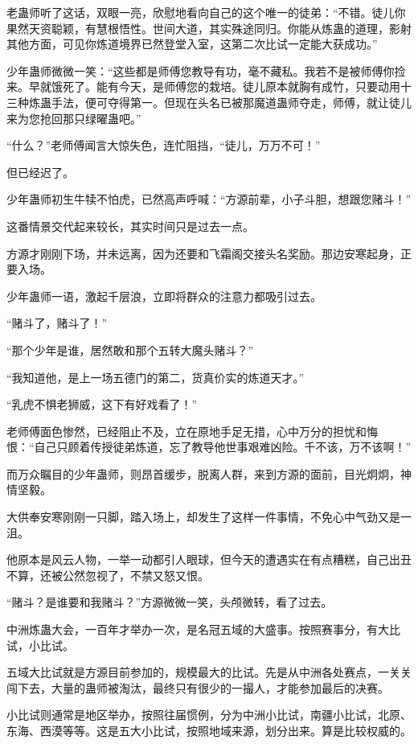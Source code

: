 \begin{this_body}
老蛊师听了这话，双眼一亮，欣慰地看向自己的这个唯一的徒弟：“不错。徒儿你果然天资聪颖，有慧根悟性。世间大道，其实殊途同归。你能从炼蛊的道理，影射其他方面，可见你炼道境界已然登堂入室，这第二次比试一定能大获成功。”

少年蛊师微微一笑：“这些都是师傅您教导有功，毫不藏私。我若不是被师傅你捡来。早就饿死了。能有今天，是师傅您的栽培。徒儿原本就胸有成竹，只要动用十三种炼蛊手法，便可夺得第一。但现在头名已被那魔道蛊师夺走，师傅，就让徒儿来为您抢回那只绿曜蛊吧。”

“什么？”老师傅闻言大惊失色，连忙阻挡，“徒儿，万万不可！”

但已经迟了。

少年蛊师初生牛犊不怕虎，已然高声呼喊：“方源前辈，小子斗胆，想跟您赌斗！”

这番情景交代起来较长，其实时间只是过去一点。

方源才刚刚下场，并未远离，因为还要和飞霜阁交接头名奖励。那边安寒起身，正要入场。

少年蛊师一语，激起千层浪，立即将群众的注意力都吸引过去。

“赌斗了，赌斗了！”

“那个少年是谁，居然敢和那个五转大魔头赌斗？”

“我知道他，是上一场五德门的第二，货真价实的炼道天才。”

“乳虎不惧老狮威，这下有好戏看了！”

老师傅面色惨然，已经阻止不及，立在原地手足无措，心中万分的担忧和悔恨：“自己只顾着传授徒弟炼道，忘了教导他世事艰难凶险。千不该，万不该啊！”

而万众瞩目的少年蛊师，则昂首缓步，脱离人群，来到方源的面前，目光炯炯，神情坚毅。

大供奉安寒刚刚一只脚，踏入场上，却发生了这样一件事情，不免心中气劲又是一沮。

他原本是风云人物，一举一动都引人眼球，但今天的遭遇实在有点糟糕，自己出丑不算，还被公然忽视了，不禁又怒又恨。

“赌斗？是谁要和我赌斗？”方源微微一笑，头颅微转，看了过去。

中洲炼蛊大会，一百年才举办一次，是名冠五域的大盛事。按照赛事分，有大比试，小比试。

五域大比试就是方源目前参加的，规模最大的比试。先是从中洲各处赛点，一关关闯下去，大量的蛊师被淘汰，最终只有很少的一撮人，才能参加最后的决赛。

小比试则通常是地区举办，按照往届惯例，分为中洲小比试，南疆小比试，北原、东海、西漠等等。这是五大小比试，按照地域来源，划分出来。算是比较权威的。


\end{this_body}
